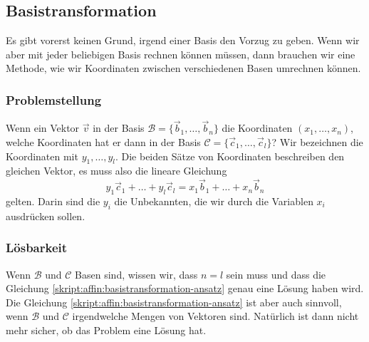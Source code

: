 %
%
\subsection{Basistransformation}
Es gibt vorerst keinen Grund, irgend einer Basis den Vorzug zu geben.
Wenn wir aber mit jeder beliebigen Basis rechnen können müssen, dann
brauchen wir eine Methode, wie wir Koordinaten zwischen verschiedenen
Basen umrechnen können.

\subsubsection{Problemstellung}
Wenn ein Vektor $\vec{v}$ in der Basis
$\mathcal{B}=\{\vec{b}_1,\dots,\vec{b}_n\}$
die Koordinaten $(x_1,\dots,x_n)$, welche Koordinaten hat er dann in
der Basis $\mathcal{C}=\{\vec{c}_1,\dots,\vec{c}_l\}$?
Wir bezeichnen die Koordinaten mit $y_1,\dots,y_l$.
Die beiden Sätze von Koordinaten beschreiben den gleichen Vektor,
es muss also die lineare Gleichung
\begin{equation}
y_1\vec{c}_1 + \dots + y_l\vec{c}_l
=
x_1\vec{b}_1 + \dots + x_n\vec{b}_n
\label{skript:affin:basistransformation-ansatz}
\end{equation}
gelten.
Darin sind die $y_i$ die Unbekannten, die wir durch die Variablen $x_i$
ausdrücken sollen.

\subsubsection{Lösbarkeit}
Wenn $\mathcal{B}$ und $\mathcal{C}$ Basen sind, wissen wir, dass
$n=l$ sein muss und dass die Gleichung
\eqref{skript:affin:basistransformation-ansatz}
genau eine Lösung haben wird.
Die Gleichung
\eqref{skript:affin:basistransformation-ansatz}
ist aber auch sinnvoll, wenn $\mathcal{B}$ und $\mathcal{C}$ irgendwelche
Mengen von Vektoren sind.
Natürlich ist dann nicht mehr sicher, ob das Problem eine Lösung hat.


